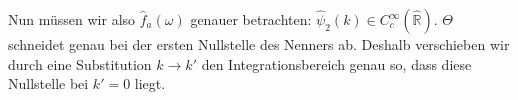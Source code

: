 
Nun müssen wir also $\hat f_a(\omega)$ genauer betrachten: $\hat\psi_2(k) \in C^\infty_c(\mathbb{\hat R})$. $\Theta$ schneidet genau bei der ersten Nullstelle des Nenners ab. Deshalb verschieben wir durch eine Substitution $k \rightarrow k'$ den Integrationsbereich genau so, dass diese Nullstelle bei $k' = 0$ liegt.

